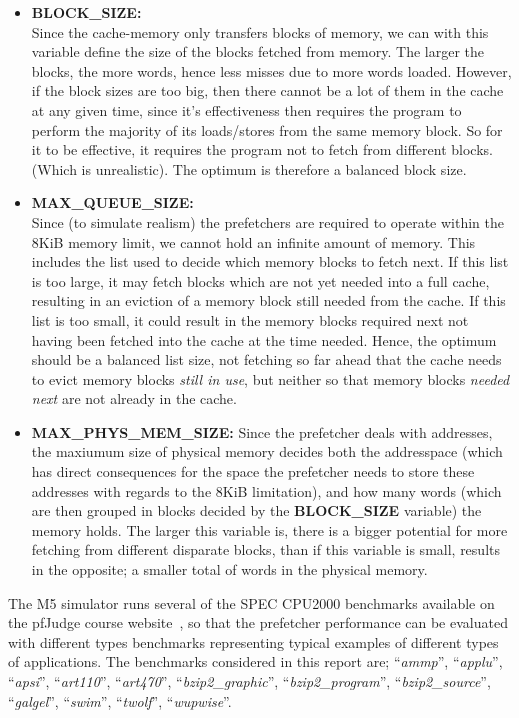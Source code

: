 \begin{itemize}
	\item \textbf{BLOCK\_SIZE:} \\
		Since the cache-memory only transfers blocks of memory, we can with this
		variable define the size of the blocks fetched from memory. The larger
		the blocks, the more words, hence less misses due to more words loaded.
		However, if the block sizes are too big, then there cannot be a lot of
		them in the cache at any given time, since it's effectiveness then
		requires the program to perform the majority of its loads/stores from
		the same memory block. So for it to be effective, it requires the
		program not to fetch from different blocks. (Which is unrealistic). The
		optimum is therefore a balanced block size.
	\item \textbf{MAX\_QUEUE\_SIZE:} \\
		Since (to simulate realism) the prefetchers are required to operate
		within the 8KiB memory limit, we cannot hold an infinite amount of
		memory. This includes the list used to decide which memory blocks to
		fetch next. If this list is too large, it may fetch blocks which are not
		yet needed into a full cache, resulting in an eviction of a memory block
		still needed from the cache. If this list is too small, it could result
		in the memory blocks required next not having been fetched into the
		cache at the time needed. Hence, the optimum should be a balanced list
		size, not fetching so far ahead that the cache needs to evict memory
		blocks \textit{still in use}, but neither so that memory blocks
		\textit{needed next} are not already in the cache.
	\item \textbf{MAX\_PHYS\_MEM\_SIZE:}
		Since the prefetcher deals with addresses, the maxiumum size of physical
		memory decides both the addresspace (which has direct consequences for
		the space the prefetcher needs to store these addresses with regards to
		the 8KiB limitation), and how many words (which are then grouped in
		blocks decided by the \textbf{BLOCK\_SIZE} variable) the memory holds.
		The larger this variable is, there is a bigger potential for more
		fetching from different disparate blocks, than if this variable is
		small, results in the opposite; a smaller total of words in the physical
		memory.
\end{itemize}

The M5 simulator runs several of the SPEC CPU2000 benchmarks available on the
pfJudge course website~\cite{guidelines}, so that the prefetcher performance can
be evaluated with different types benchmarks representing typical examples of
different types of applications. The benchmarks considered in this report are;
``\emph{ammp}'', ``\emph{applu}'', ``\emph{apsi}'', ``\emph{art110}'',
``\emph{art470}'', ``\emph{bzip2\_graphic}'', ``\emph{bzip2\_program}'',
``\emph{bzip2\_source}'', ``\emph{galgel}'', ``\emph{swim}'', ``\emph{twolf}'',
``\emph{wupwise}''.

